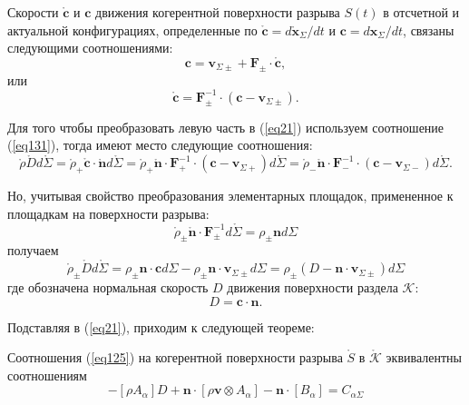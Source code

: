 \begin{theorem}
	Скорости $\mathring{\mathbf{c}}$ и $\mathbf{c}$ движения когерентной поверхности разрыва
	$S(t)$ в отсчетной и актуальной конфигурациях, определенные по $\mathbf{\mathring{c}}=d\mathring{\mathbf{x}}_\Sigma/dt$ и $\mathbf{c}=d\mathbf{x}_\Sigma/dt$, связаны следующими соотношениями:
	\begin{equation}
		\mathbf{c}=\mathbf{v}_{\Sigma\pm}+\mathbf{F}_\pm\cdot \mathring{\mathbf{c}},
	\end{equation}
	или
	\begin{equation}\label{eq131}
		\mathring{\mathbf{c}}=\mathbf{F}_\pm^{-1}\cdot(\mathbf{c}-\mathbf{v}_{\Sigma\pm}).
	\end{equation}
\end{theorem}

Для того чтобы преобразовать левую часть в (\ref{eq21}) используем соотношение (\ref{eq131}), тогда имеют место следующие соотношения:
\[
\mathring{\rho}\mathring{D}d\mathring{\Sigma}=\mathring{\rho}_+\mathring{\mathbf{c}}\cdot\mathring{\mathbf{n}}d\mathring{\Sigma}=\mathring{\rho}_+\mathring{\mathbf{n}}\cdot\mathbf{F}_+^{-1}\cdot(\mathbf{c}-\mathbf{v}_{\Sigma+})d\mathring{\Sigma}=\mathring{\rho}_-\mathring{\mathbf{n}}\cdot\mathbf{F}_-^{-1}\cdot(\mathbf{c}-\mathbf{v}_{\Sigma-})d\mathring{\Sigma}.
\]

Но, учитывая свойство преобразования элементарных площадок,
примененное к площадкам на поверхности разрыва:
\[
\mathring{\rho}_\pm\mathring{\mathbf{n}}\cdot \mathbf{F}_\pm^{-1}d\mathring{\Sigma}=\rho_\pm\mathbf{n}d\Sigma
\]
получаем
\[
\mathring{\rho}_\pm\mathring{D}d\mathring{\Sigma}=\rho_\pm\mathbf{n}\cdot\mathbf{c}d\Sigma-\rho_\pm\mathbf{n}\cdot\mathbf{v}_{\Sigma\pm}d\Sigma=\rho_\pm(D-\mathbf{n}\cdot\mathbf{v}_{\Sigma\pm})d\Sigma
\]
где обозначена нормальная скорость $D$ движения поверхности раздела $\mathcal{K}$:
\[
D=\mathbf{c}\cdot\mathbf{n}.
\]

Подставляя в (\ref{eq21}), приходим к следующей теореме:
\begin{theorem}
	Соотношения (\ref{eq125}) на когерентной поверхности разрыва $\mathring{S}$ в $\mathring{\mathcal{K}}$ эквивалентны соотношениям
	\begin{equation}
		-[\rho A_\alpha]D+\mathbf{n}\cdot[\rho\mathbf{v}\otimes A_\alpha]-\mathbf{n}\cdot[B_\alpha]=C_{\alpha\Sigma}
	\end{equation}
\end{theorem}